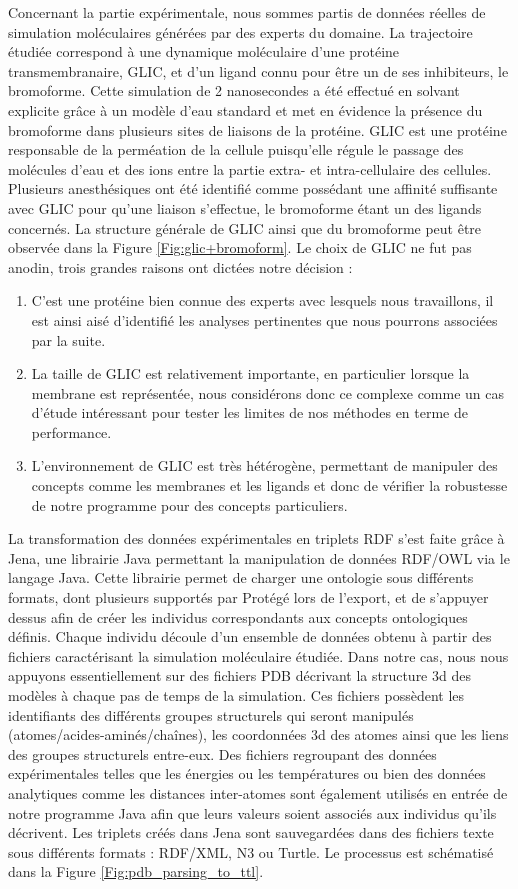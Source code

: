 Concernant la partie expérimentale, nous sommes partis de données réelles de simulation moléculaires générées par des experts du domaine. La trajectoire étudiée correspond à une dynamique moléculaire d'une protéine transmembranaire, GLIC, et d'un ligand connu pour être un de ses inhibiteurs, le bromoforme. Cette simulation de 2 nanosecondes a été effectué en solvant explicite grâce à un modèle d'eau standard et met en évidence la présence du bromoforme dans plusieurs sites de liaisons de la protéine. GLIC est une protéine responsable de la perméation de la cellule puisqu'elle régule le passage des molécules d'eau et des ions entre la partie extra- et intra-cellulaire des cellules. Plusieurs anesthésiques ont été identifié comme possédant une affinité suffisante avec GLIC pour qu'une liaison s'effectue, le bromoforme étant un des ligands concernés. La structure générale de GLIC ainsi que du bromoforme peut être observée dans la Figure \ref{Fig:glic+bromoform}. Le choix de GLIC ne fut pas anodin, trois grandes raisons ont dictées notre décision :
\begin{enumerate}
	\item C'est une protéine bien connue des experts avec lesquels nous travaillons, il est ainsi aisé d'identifié les analyses pertinentes que nous pourrons associées par la suite.
	\item La taille de GLIC est relativement importante, en particulier lorsque la membrane est représentée, nous considérons donc ce complexe comme un cas d'étude intéressant pour tester les limites de nos méthodes en terme de performance.
	\item L'environnement de GLIC est très hétérogène, permettant de manipuler des concepts comme les membranes et les ligands et donc de vérifier la robustesse de notre programme pour des concepts particuliers.
\end{enumerate}

La transformation des données expérimentales en triplets RDF s'est faite grâce à Jena, une librairie Java permettant la manipulation de données RDF/OWL via le langage Java. Cette librairie permet de charger une ontologie sous différents formats, dont plusieurs supportés par Protégé lors de l'export, et de s'appuyer dessus afin de créer les individus correspondants aux concepts ontologiques définis. Chaque individu découle d'un ensemble de données obtenu à partir des fichiers caractérisant la simulation moléculaire étudiée. Dans notre cas, nous nous appuyons essentiellement sur des fichiers PDB décrivant la structure 3d des modèles à chaque pas de temps de la simulation. Ces fichiers possèdent les identifiants des différents groupes structurels qui seront manipulés (atomes/acides-aminés/chaînes), les coordonnées 3d des atomes ainsi que les liens des groupes structurels entre-eux. Des fichiers regroupant des données expérimentales telles que les énergies ou les températures ou bien des données analytiques comme les distances inter-atomes sont également utilisés en entrée de notre programme Java afin que leurs valeurs soient associés aux individus qu'ils décrivent. Les triplets créés dans Jena sont sauvegardées dans des fichiers texte sous différents formats : RDF/XML, N3 ou Turtle. Le processus est schématisé dans la Figure \ref{Fig:pdb_parsing_to_ttl}.


